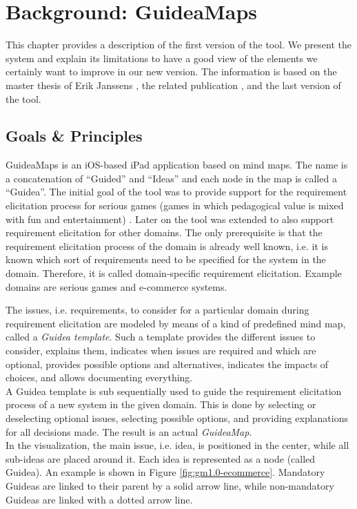 \chapter{Background: GuideaMaps}\label{ch:background-guideamaps}
This chapter provides a description of the first version of the tool. We present the system and explain its limitations to have a good view of the elements we certainly want to improve in our new version. The information is based on the master thesis of Erik Janssens \citep{erikjanssens}, the related publication \citep{detroyerjanssens}, and the last version of the tool.

\section{Goals \& Principles}
GuideaMaps is an iOS-based iPad application based on mind maps. The name is a concatenation of ``Guided'' and ``Ideas'' and each node in the map is called a ``Guidea''. The initial goal of the tool was to provide support for the requirement elicitation process for serious games (games in which pedagogical value is mixed with fun and entertainment) \citep{erikjanssens}. Later on the tool was extended to also support requirement elicitation for other domains. The only prerequisite is that the requirement elicitation process of the domain is already well known, i.e. it is known which sort of requirements need to be specified for the system in the domain. Therefore, it is called domain-specific requirement elicitation. Example domains are serious games and e-commerce systems.

The issues, i.e. requirements, to consider for a particular domain during requirement elicitation are modeled by means of a kind of predefined mind map, called a \textit{Guidea template}. Such a template provides the different issues to consider, explains them, indicates when issues are required and which are optional, provides possible options and alternatives, indicates the impacts of choices, and allows documenting everything.\\

A Guidea template is sub sequentially used to guide the requirement elicitation process of a new system in the given domain. This is done by selecting or deselecting optional issues, selecting possible options, and providing explanations for all decisions made. The result is an actual \textit{GuideaMap}.\\

In the visualization, the main issue, i.e. idea, is positioned in the center, while all sub-ideas are placed around it. Each idea is represented as a node (called Guidea). An example is shown in Figure \ref{fig:gm1.0-ecommerce}. Mandatory Guideas are linked to their parent by a solid arrow line, while non-mandatory Guideas are linked with a dotted arrow line.\\

